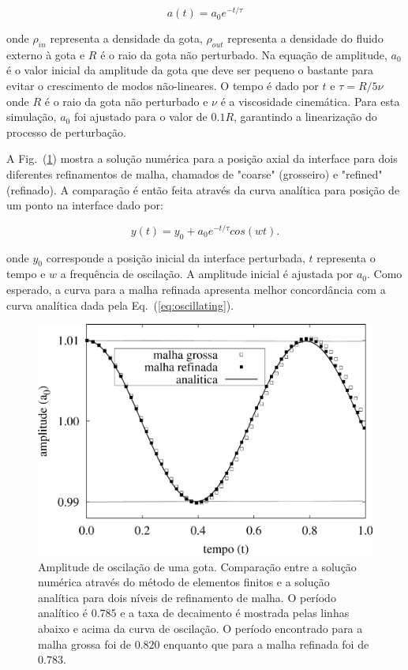 \documentclass[a4paper,portuges,12pt]{article}
\begin{document}
\begin{equation}
	a(t) = a_0 e^{-t/\tau}
\label{eq:amplitude}
\end{equation}

\noindent onde $\rho_{in}$ representa a densidade da gota, $\rho_{out}$
representa a densidade do fluido externo à gota e $R$ é o raio da gota
não perturbado. Na equação de amplitude, $a_0$ é o valor inicial da
amplitude da gota que deve ser pequeno o bastante para evitar o
crescimento de modos não-lineares. O tempo é dado por $t$ e $\tau=R/5\nu$
onde $R$ é o raio da gota não perturbado e $\nu$ é a viscosidade
cinemática. Para esta simulação, $a_0$ foi ajustado para o valor de
$0.1R$, garantindo a linearização do processo de perturbação. 

A Fig.~(\ref{fig:oscillating}) mostra a solução numérica para a
posição axial da interface para dois diferentes refinamentos de malha,
chamados de "coarse" (grosseiro) e "refined" (refinado). A comparação é
então feita através da curva analítica para posição de um ponto na
interface dado por:

\begin{equation}
	y(t) = y_0 + a_0 e^{-t/\tau} cos(wt).
\label{eq:oscillating}
\end{equation}

\noindent onde $y_0$ corresponde a posição inicial da interface
perturbada, $t$ representa o tempo e $w$ a frequência de oscilação. A
amplitude inicial é ajustada por $a_0$. Como esperado, a curva para a
malha refinada apresenta melhor concordância com a curva analítica dada
pela Eq.~(\ref{eq:oscillating}).

 \begin{figure}[h!]
 	\begin{center}
 		\includegraphics[angle=0, scale=0.5]{figs/oscillating.pdf}
 	\end{center}
	\caption{Amplitude de oscilação de uma gota. Comparação entre a
	solução numérica através do método de elementos finitos e a solução
	analítica para dois níveis de refinamento de malha. O período
	analítico é $0.785$ e a taxa de decaimento é mostrada pelas linhas
	abaixo e acima da curva de oscilação. O período encontrado para a
	malha grossa foi de $0.820$ enquanto que para a malha refinada foi
	de $0.783$.}
 	\label{fig:oscillating} 
 \end{figure}
\end{document}
